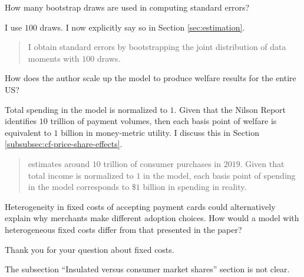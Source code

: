 \documentclass[main.tex]{subfiles}
\begin{document}
\begin{refsection}
\begin{refcommentnoclear}
How many bootstrap draws are used in computing standard errors?
\end{refcommentnoclear}

I use $100$ draws.
I now explicitly say so in Section \ref{sec:estimation}.

\begin{quote}
    I obtain standard errors by bootstrapping the joint distribution of data moments with $100$ draws.
\end{quote}

\begin{refcommentnoclear}
How does the author scale up the model to produce welfare results for the entire US?
\end{refcommentnoclear}

Total spending in the model is normalized to $1$.
Given that the Nilson Report identifies $10$ trillion of payment volumes, then each basis point of welfare is equivalent to $1$ billion in money-metric utility.
I discuss this in Section \ref{subsubsec:cf-price-share-effects}.

\begin{quote}
    \textcite{Nilson2020a} estimates around $10$ trillion of consumer purchases in $2019$.
Given that total income is normalized to $1$ in the model, each basis point of spending in the model corresponds to \$$1$ billion in spending in reality.
\end{quote}

\begin{refcommentnoclear}
Heterogeneity in fixed costs of accepting payment cards could alternatively explain why merchants make different adoption choices.
How would a model with heterogeneous fixed costs differ from that presented in the paper?
\end{refcommentnoclear}

Thank you for your question about fixed costs.
\replyfixedcostsize

\begin{refcommentnoclear}
The subsection “Insulated versus consumer market shares” section is not clear.
\end{refcommentnoclear}

\replyshares


\end{refsection}
\end{document}
